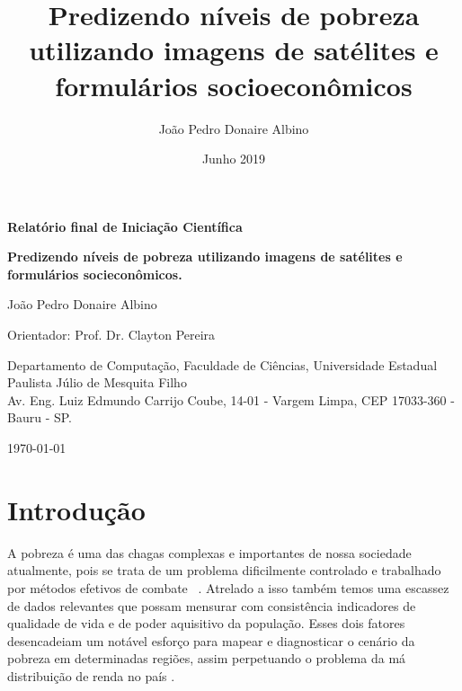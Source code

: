 \documentclass[]{article}
\title{Predizendo ní­veis de pobreza utilizando imagens de satélites e formulários socioeconômicos}
\author{João Pedro Donaire Albino }
\date{Junho 2019}
\begin{document}
\begin{center}
	\renewcommand{\baselinestretch}{1}
\end{center}

\vspace*{1cm}

\begin{center}
	\textbf{Relatório final de Iniciação Científica}
	
	\vspace*{1cm}
	
	\renewcommand{\baselinestretch}{2}
	\bf {\huge \sc Predizendo níveis de pobreza utilizando imagens de satélites e formulários socieconômicos.}
	\renewcommand{\baselinestretch}{1}
	
\end{center}

\vspace*{2.0cm}

\begin{center}
	
	\large João Pedro Donaire Albino
	
	\vspace*{1.0cm}
	
	\large Orientador:
	\large Prof. Dr. Clayton Pereira
	
	\vspace*{0.5cm}
	
	Departamento de Computação, Faculdade de Ciências, Universidade Estadual Paulista Júlio de Mesquita Filho\\
	Av. Eng. Luiz Edmundo Carrijo Coube, 14-01 - Vargem Limpa, CEP 17033-360 - Bauru - SP.
	
\end{center}

\vspace*{2.0cm}

\centerline{\large \today}

\newpage

\section{Introdução}
\label{s.introducao}

A pobreza é uma das chagas complexas e importantes de nossa sociedade atualmente, pois se trata de um problema dificilmente controlado e trabalhado por métodos efetivos de combate ~\cite{ref_pobreza1}. Atrelado a isso também temos uma escassez de dados relevantes que possam mensurar com consistência indicadores de qualidade de vida e de poder aquisitivo da população. Esses dois fatores desencadeiam um notável esforço para mapear e diagnosticar o cenário da pobreza em determinadas regiões, assim perpetuando o problema da má distribuição de renda no país \cite{ref_ma_distribuicao}.
\end{document}
